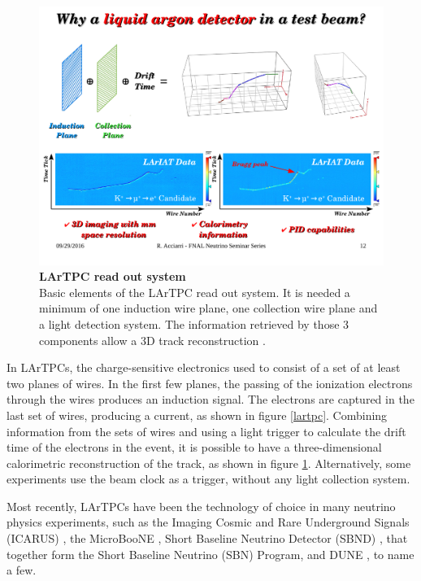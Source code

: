 \begin{figure}[h!]
	\begin{center}
		\includegraphics[scale=0.6]{Figures/Acciarri_fig2.pdf}
		\caption[LArTPC read out system]{ {\textbf{LArTPC read out system}} \\ Basic elements of the LArTPC read out system. It is needed a minimum of one induction wire plane, one collection wire plane and a light detection system. The information retrieved by those 3 components allow a 3D track reconstruction \cite{Acciarri_presentation}.}
		\label{lartpc_readout}	
	\end{center}
\end{figure}

In LArTPCs, the charge-sensitive electronics used to consist of a set of at least two planes of wires. In the first few planes, the passing of the ionization electrons through the wires produces an induction signal. The electrons are captured in the last set of wires, producing a current, as shown in figure \ref{lartpc}. Combining information from the sets of wires and using a light trigger to calculate the drift time of the electrons in the event, it is possible to have a three-dimensional calorimetric reconstruction of the track, as shown in figure \ref{lartpc_readout}. Alternatively, some experiments use the beam clock as a trigger, without any light collection system. 

Most recently, LArTPCs have been the technology of choice in many neutrino physics experiments, such as the Imaging Cosmic and Rare Underground Signals (ICARUS) \cite{ICARUS_proposal}, the MicroBooNE \cite{microboone_proposal}, Short Baseline Neutrino Detector (SBND) \cite{SBND}, that together form the Short Baseline Neutrino (SBN) Program, and DUNE \cite{dune_snowmass_22}, to name a few.

